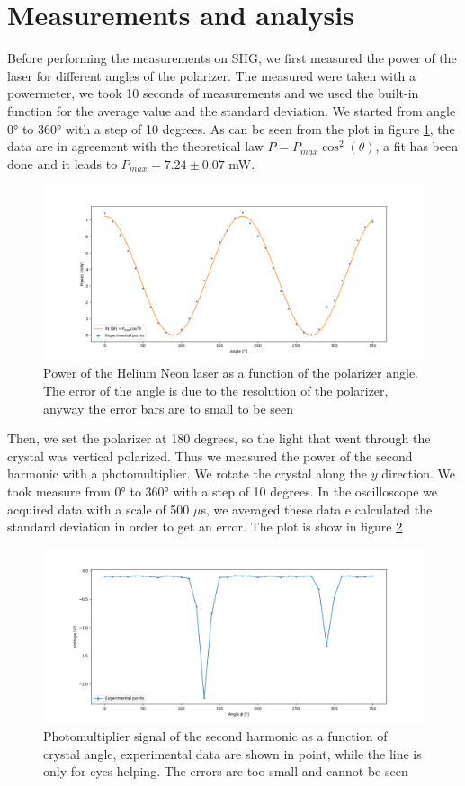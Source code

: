\documentclass[a4paper,10pt]{article}
\begin{document}
\section{Measurements and analysis}
Before performing the measurements on SHG, we first measured the power of the laser for different angles of the polarizer. The measured were taken with a powermeter, we took 10 seconds of measurements and we used the built-in function for the average value and the standard deviation. We started from angle 0° to 360° with a step of 10 degrees. As can be seen from the plot in figure \ref{polarizer}, the data are in agreement with the theoretical law $P = P_{max}\cos^2(\theta)$, a fit has been done and it leads to $P_{max} = 7.24\pm  0.07$ mW.
\begin{figure}[H]
\centering
\includegraphics[width = \textwidth]{polarization}
\caption{Power of the Helium Neon laser as a function of the polarizer angle. The error of the angle is due to the resolution of the polarizer, anyway the error bars are to small to be seen}
\label{polarizer}
\end{figure}
Then, we set the polarizer at 180 degrees, so the light that went through the crystal was vertical polarized. Thus we measured the power of the second harmonic with a photomultiplier. We rotate the crystal along the $y$ direction. We took measure from 0° to 360° with a step of 10 degrees. In the oscilloscope we acquired data with a scale of 500 $\mu$s, we averaged these data e calculated the standard deviation in order to get an error. The plot is show in figure \ref{spectrum}
\begin{figure}[H]
\centering
\includegraphics[width = \textwidth]{spectrum}
\caption{Photomultiplier signal of the second harmonic as a function of crystal angle, experimental data are shown in point, while the line is only for eyes helping. The errors are too small and cannot be seen}
\label{spectrum}
\end{figure}
\end{document}
